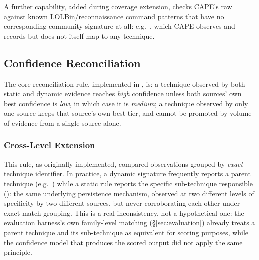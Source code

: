 A further capability, added during coverage extension, checks CAPE's
raw  against known LOLBin/reconnaissance
command patterns that have no corresponding community signature at
all: e.g.\ , which CAPE observes and
records but does not itself map to any technique.

\subsection{Confidence Reconciliation}
\label{sec:reconciliation}

The core reconciliation rule, implemented
in , is: a technique observed by both static and
dynamic evidence reaches \emph{high} confidence unless both sources'
own best confidence is \emph{low}, in which case it is \emph{medium};
a technique observed by only one source keeps that source's own best
tier, and cannot be promoted by volume of evidence from a single
source alone.

\subsubsection{Cross-Level Extension}

This rule, as originally implemented, compared observations grouped by
\emph{exact} technique identifier. In practice, a dynamic signature
frequently reports a parent technique (e.g.\ ) while a
static rule reports the specific sub-technique responsible
(): the same underlying persistence mechanism,
observed at two different levels of specificity by two different
sources, but never corroborating each other under exact-match
grouping. This is a real inconsistency, not a hypothetical one: the
evaluation harness's own family-level matching (\S\ref{sec:evaluation})
already treats a parent technique and its sub-technique as equivalent
for scoring purposes, while the confidence model that produces the
scored output did not apply the same principle.

